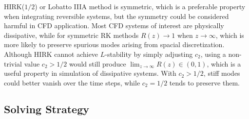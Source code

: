 \documentclass[preprint,12pt]{elsarticle}
\begin{document}
HIRK($1/2$) or Lobatto IIIA method is symmetric,
which is a preferable property when integrating
reversible systems,
but the symmetry could be considered harmful in CFD application.
Most CFD systems of interest are physically dissipative,
while for symmetric RK methods
$R(z) \rightarrow 1$ when $z \rightarrow \infty$,
which is more likely to preserve
spurious modes arising from spacial discretization.
Although HIRK cannot achieve $L$-stability
by simply adjusting $c_2$,
using a non-trivial value $c_2 > 1/2$ would still
produce $\lim_{z\rightarrow\infty}R(z)\in(0,1)$, which
is a useful property in simulation of dissipative systems.
With  $c_2 > 1/2$, stiff modes could better vanish over the time
steps, while $c_2 = 1/2$ tends to preserve them.


\subsection{Solving Strategy}

\newcommand{\Res}{\mathcal{R}}
\newcommand{\Jres}{\mathcal{J}}
\newcommand{\eye}{\mathbf{I}}
\newcommand{\J}{\mathbf{J}}
\end{document}
